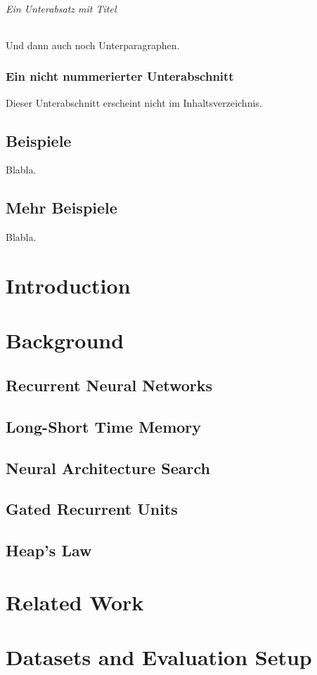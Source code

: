 \documentclass[11pt,a4paper,twoside,openright]{scrbook}
\begin{document}
\subparagraph{Ein Unterabsatz mit Titel}
Und dann auch noch Unterparagraphen.

\subsection*{Ein nicht nummerierter Unterabschnitt}
Dieser Unterabschnitt erscheint nicht im Inhaltsverzeichnis.
\newpage

\section{Beispiele}
Blabla.
\newpage

\section{Mehr Beispiele}
Blabla.
\newpage

\chapter{Introduction}
\cite{irbook}

\chapter{Background}
\section{Recurrent Neural Networks}
\section{Long-Short Time Memory}
\section{Neural Architecture Search}
\section{Gated Recurrent Units}
\section{Heap's Law}

\chapter{Related Work}

\chapter{Datasets and Evaluation Setup}
\end{document}
